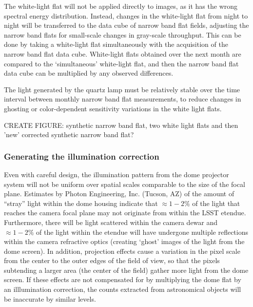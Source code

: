 \documentclass[12pt,preprint]{aastex}
\begin{document}
The white-light flat will not be applied directly to images, as it has
the wrong spectral energy distribution. Instead, changes in the
white-light flat from night to night will be transferred to the data
cube of narrow band flat fields, adjusting the narrow band flats for
small-scale changes in gray-scale throughput. This can be done by taking a
white-light flat simultaneously with the acquisition of the narrow
band flat data cube. White-light flats obtained over the next month
are compared to the `simultaneous' white-light flat, and then the
narrow band flat data cube can be multiplied by any observed differences.

The light generated by the quartz lamp must be relatively stable over
the time interval between monthly narrow band flat measurements, to
reduce changes in ghosting or color-dependent sensitivity variations
in the white light flats.

CREATE FIGURE: synthetic narrow band flat, two white light flats and then 'new'
corrected synthetic narrow band flat?

\subsubsection{Generating the illumination correction}

Even with careful design, the illumination pattern from the dome
projector system will not be uniform over spatial scales comparable to
the size of the focal plane. Estimates by Photon Engineering,
Inc. (Tucson, AZ) of the amount of ``stray'' light within the dome
housing indicate that $\approx 1−2\%$ of the light that reaches the
camera focal plane may not originate from within the LSST etendue.
Furthermore, there will be light scattered within the camera dewar and
$\approx 1-2\%$ of the light within the etendue will have undergone
multiple reflections within the camera refractive optics (creating
`ghost' images of the light from the dome screen). In addition,
projection effects cause a variation in the pixel scale from the
center to the outer edges of the field of view, so that the pixels
subtending a larger area (the center of the field) gather more light
from the dome screen. If these effects are not compensated for by
multiplying the dome flat by an illlumination correction, the counts
extracted from astronomical objects will be inaccurate by similar
levels.
\end{document}
